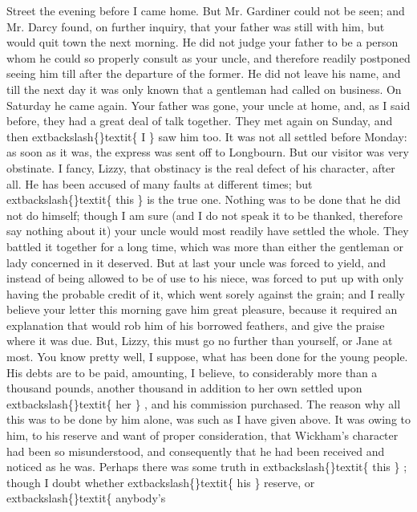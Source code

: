 \documentclass[10pt]{book}
\begin{document}
Street the evening before I came home. But Mr. Gardiner could not
be seen; and Mr. Darcy found, on further inquiry, that your father
was still with him, but would quit town the next morning. He did
not judge your father to be a person whom he could so properly
consult as your uncle, and therefore readily postponed seeing him
till after the
    departure of the former. He did not leave his name,
and till the next day it was only known that a gentleman had called
on business. On Saturday he came again. Your father was gone, your
uncle at home, and, as I said before, they had a great deal of talk
together. They met again on Sunday, and then
    	extbackslash\{\}textit\{
     I
    \}
    saw him too. It
was not all settled before Monday: as soon as it was, the express
was sent off to Longbourn. But our visitor was very obstinate. I
fancy, Lizzy, that obstinacy is the real defect of his character,
after all. He has been accused of many faults at different times;
but
    	extbackslash\{\}textit\{
     this
    \}
    is the true one. Nothing was to be done that he did not
do himself; though I am sure (and I do not speak it to be thanked,
therefore say nothing about it) your uncle would most readily have
settled the whole. They battled it together for a long time, which
was more than either the gentleman or lady concerned in it
deserved. But at last your uncle was forced to yield, and instead
of being allowed to be of use to his niece, was forced to put up
with only having the probable credit of it, which went sorely
against the grain; and I really believe your letter this morning
gave him great pleasure, because it required an explanation that
would rob him of his borrowed feathers, and give the praise where
it was due. But, Lizzy, this must go no further than yourself, or
Jane at most. You know pretty well, I suppose, what has been done
for the young people. His debts are to be paid, amounting, I
believe, to considerably more than a thousand pounds, another
thousand in addition to her own settled upon
    	extbackslash\{\}textit\{
     her
    \}
    , and his
commission purchased. The reason why all this was to be done by him
alone, was such as I have given above. It was owing to him, to his
reserve and want of proper consideration, that Wickham’s character
had been so
    misunderstood, and consequently that he had been
received and noticed as he was. Perhaps there was some truth in
    	extbackslash\{\}textit\{
     this
    \}
    ; though I doubt whether
    	extbackslash\{\}textit\{
     his
    \}
    reserve, or
    	extbackslash\{\}textit\{
     anybody’s
\end{document}
